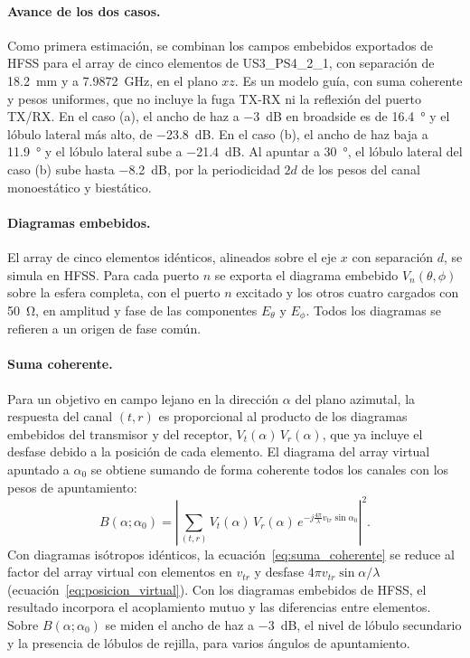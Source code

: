 \documentclass[11pt,a4paper]{article}
\begin{document}
\paragraph{Avance de los dos casos.} Como primera estimación, se combinan los campos embebidos exportados
de HFSS para el array de cinco elementos de US3\_PS4\_2\_1, con separación de \SI{18.2}{mm} y a
\SI{7.9872}{GHz}, en el plano $xz$. Es un modelo guía, con suma coherente y pesos
uniformes, que no incluye la fuga TX-RX ni la reflexión del puerto TX/RX. En el caso (a), el ancho de haz a \SI{-3}{dB} en broadside es de
\SI{16.4}{\degree} y el lóbulo lateral más alto, de \SI{-23.8}{dB}. En el caso (b), el ancho de haz baja a
\SI{11.9}{\degree} y el lóbulo lateral sube a \SI{-21.4}{dB}. Al apuntar a \SI{30}{\degree}, el lóbulo
lateral del caso (b) sube hasta \SI{-8.2}{dB}, por la periodicidad $2d$ de los pesos del canal
monoestático y biestático.

\paragraph{Diagramas embebidos.} El array de cinco elementos idénticos, alineados sobre el eje
$x$ con separación $d$, se simula en HFSS. Para cada puerto $n$ se exporta el diagrama embebido
$V_n(\theta,\phi)$ sobre la esfera completa, con el puerto $n$ excitado y los otros cuatro
cargados con \SI{50}{\ohm}, en amplitud y fase de las componentes $E_\theta$ y $E_\phi$. Todos
los diagramas se refieren a un origen de fase común.

\paragraph{Suma coherente.} Para un objetivo en campo lejano en la dirección $\alpha$ del plano
azimutal, la respuesta del canal $(t,r)$ es proporcional al producto de los diagramas embebidos
del transmisor y del receptor, $V_t(\alpha)\,V_r(\alpha)$, que ya incluye el desfase debido a la
posición de cada elemento. El diagrama del array virtual apuntado a $\alpha_0$ se obtiene
sumando de forma coherente todos los canales con los pesos de apuntamiento:
\begin{equation}
    B(\alpha;\alpha_0) = \left|\sum_{(t,r)} V_t(\alpha)\,V_r(\alpha)\,
    e^{-j \frac{4\pi}{\lambda} v_{tr}\sin\alpha_0}\right|^2.
    \label{eq:suma_coherente}
\end{equation}
Con diagramas isótropos idénticos, la ecuación~\eqref{eq:suma_coherente} se reduce al factor del
array virtual con elementos en $v_{tr}$ y desfase $4\pi v_{tr}\sin\alpha/\lambda$
(ecuación~\eqref{eq:posicion_virtual}). Con los
diagramas embebidos de HFSS, el resultado incorpora el acoplamiento mutuo y las diferencias entre
elementos. Sobre $B(\alpha;\alpha_0)$ se miden el ancho de haz a \SI{-3}{dB}, el nivel de lóbulo
secundario y la presencia de lóbulos de rejilla, para varios ángulos de apuntamiento.
\end{document}
